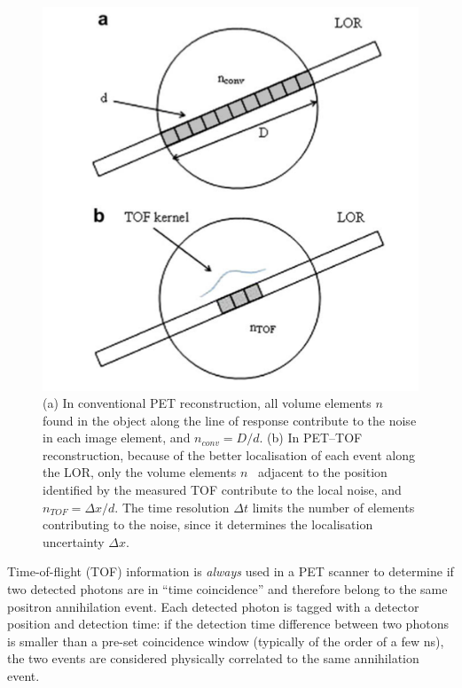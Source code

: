 \begin{figure}[!htb]
	\centering
	\includegraphics[scale=0.8]{img/TOF.png}
	\caption{\label{fig.tof} (a) In conventional PET reconstruction, all volume elements $n$~ found in the object along the line of response contribute to the noise in each image element, and $n_{conv} = D/d$. (b) In PET--TOF reconstruction, because of the better localisation of each event along the LOR, only the volume elements $n$~ adjacent to the position identified by the measured TOF contribute to the local noise, and $n_{TOF} = \Delta x/d$. The time resolution  $\Delta t$ limits the number of elements contributing to the noise, since it determines the localisation uncertainty $\Delta x$. }
\end{figure}


Time-of-flight (TOF) information is {\em always} used in a PET scanner to determine if two detected photons are in ``time coincidence'' and therefore belong to the same positron annihilation event.
Each detected photon is tagged with a detector position and detection time: if the detection time difference between two photons is smaller than a pre-set coincidence window (typically of the order of a few ns), the two events are considered physically correlated to the same annihilation event. 

